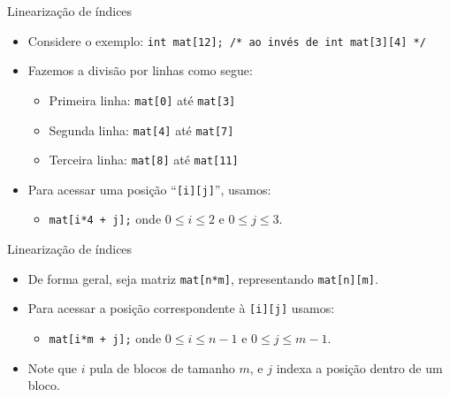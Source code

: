 \documentclass[handout]{beamer}
\newcommand{\cod}[1]{\texttt{#1}}
\begin{document}
\begin{frame}[fragile]{Linearização de índices}

    \begin{itemize}
        \item Considere o exemplo: \cod{int mat[12]; /* ao invés de int mat[3][4] */}
        \item Fazemos a divisão por linhas como segue:
        \begin{itemize}
            \item Primeira linha: \cod{mat[0]} até \cod{mat[3]} 
            \item Segunda linha: \cod{mat[4]} até \cod{mat[7]} 
            \item Terceira linha: \cod{mat[8]} até \cod{mat[11]} 
        \end{itemize}
        \item Para acessar uma posição ``\cod{[i][j]}'', usamos:
        \begin{itemize}
            \item  \cod{mat[i*4 + j];} onde $0 \le i \le 2$ e $0 \le j \le 3$. 
        \end{itemize}
    \end{itemize}

\end{frame}

\begin{frame}[fragile]{Linearização de índices}

    \begin{itemize}
        \item De forma geral, seja matriz \cod{mat[n*m]}, representando \cod{mat[n][m]}.
        \item Para acessar a posição correspondente à \cod{[i][j]} usamos:
        \begin{itemize}
            \item  \cod{mat[i*m + j];} onde $0 \le i \le n-1$  e $0 \le j \le m-1$.
        \end{itemize}
        \item Note que $i$ pula de blocos de tamanho $m$, e $j$ indexa a posição dentro de um bloco.
    \end{itemize}

\end{frame}
\end{document}
